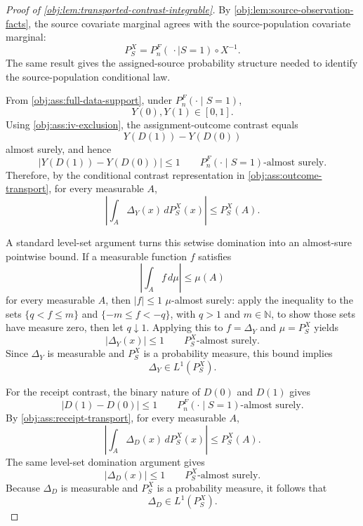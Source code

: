 \begin{proof}[Proof of \cref{obj:lem:transported-contrast-integrable}]
By \cref{obj:lem:source-observation-facts}, the source covariate marginal agrees with the source-population covariate marginal:
\[
P_S^X
=
P_n^F(\,\cdot\mid S=1)\circ X^{-1}.
\]
The same result gives the assigned-source probability structure needed to identify the source-population conditional law. %

From \cref{obj:ass:full-data-support}, under \(P_n^F(\cdot\mid S=1)\),
\[
Y(0),Y(1)\in[0,1].
\]
Using \cref{obj:ass:iv-exclusion}, the assignment-outcome contrast equals
\[
Y(D(1))-Y(D(0))
\]
almost surely, and hence
\[
\left|Y(D(1))-Y(D(0))\right|\le1
\qquad P_n^F(\cdot\mid S=1)\text{-almost surely}.
\]
Therefore, by the conditional contrast representation in \cref{obj:ass:outcome-transport}, for every measurable \(A\),
\[
\left|\int_A \Delta_Y(x)\,dP_S^X(x)\right|
\le
P_S^X(A).
\]

A standard level-set argument turns this setwise domination into an almost-sure pointwise bound. If a measurable function \(f\) satisfies
\[
\left|\int_A f\,d\mu\right|\le\mu(A)
\]
for every measurable \(A\), then \(|f|\le1\) \(\mu\)-almost surely: apply the inequality to the sets \(\{q<f\le m\}\) and \(\{-m\le f<-q\}\), with \(q>1\) and \(m\in\mathbb N\), to show those sets have measure zero, then let \(q\downarrow1\). Applying this to \(f=\Delta_Y\) and \(\mu=P_S^X\) yields
\[
|\Delta_Y(x)|\le1
\qquad P_S^X\text{-almost surely}.
\]
Since \(\Delta_Y\) is measurable and \(P_S^X\) is a probability measure, this bound implies
\[
\Delta_Y\in L^1(P_S^X).
\]

For the receipt contrast, the binary nature of \(D(0)\) and \(D(1)\) gives
\[
\left|D(1)-D(0)\right|\le1
\qquad P_n^F(\cdot\mid S=1)\text{-almost surely}.
\]
By \cref{obj:ass:receipt-transport}, for every measurable \(A\),
\[
\left|\int_A \Delta_D(x)\,dP_S^X(x)\right|
\le
P_S^X(A).
\]
The same level-set domination argument gives
\[
|\Delta_D(x)|\le1
\qquad P_S^X\text{-almost surely}.
\]
Because \(\Delta_D\) is measurable and \(P_S^X\) is a probability measure, it follows that
\[
\Delta_D\in L^1(P_S^X).
\]
\end{proof}
